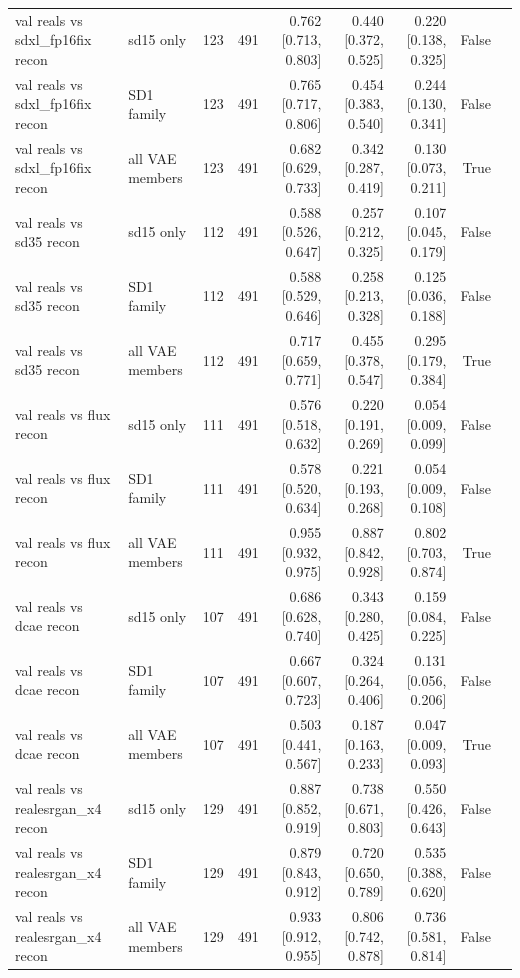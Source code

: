 \begin{table}[htbp]
\begin{tabular}{llrrrrrrr}
val reals vs sdxl\_fp16fix recon & sd15 only & 123 & 491 & 0.762 [0.713, 0.803] & 0.440 [0.372, 0.525] & 0.220 [0.138, 0.325] & False &  \\
val reals vs sdxl\_fp16fix recon & SD1 family & 123 & 491 & 0.765 [0.717, 0.806] & 0.454 [0.383, 0.540] & 0.244 [0.130, 0.341] & False &  \\
val reals vs sdxl\_fp16fix recon & all VAE members & 123 & 491 & 0.682 [0.629, 0.733] & 0.342 [0.287, 0.419] & 0.130 [0.073, 0.211] & True &  \\
val reals vs sd35 recon & sd15 only & 112 & 491 & 0.588 [0.526, 0.647] & 0.257 [0.212, 0.325] & 0.107 [0.045, 0.179] & False &  \\
val reals vs sd35 recon & SD1 family & 112 & 491 & 0.588 [0.529, 0.646] & 0.258 [0.213, 0.328] & 0.125 [0.036, 0.188] & False &  \\
val reals vs sd35 recon & all VAE members & 112 & 491 & 0.717 [0.659, 0.771] & 0.455 [0.378, 0.547] & 0.295 [0.179, 0.384] & True &  \\
val reals vs flux recon & sd15 only & 111 & 491 & 0.576 [0.518, 0.632] & 0.220 [0.191, 0.269] & 0.054 [0.009, 0.099] & False &  \\
val reals vs flux recon & SD1 family & 111 & 491 & 0.578 [0.520, 0.634] & 0.221 [0.193, 0.268] & 0.054 [0.009, 0.108] & False &  \\
val reals vs flux recon & all VAE members & 111 & 491 & 0.955 [0.932, 0.975] & 0.887 [0.842, 0.928] & 0.802 [0.703, 0.874] & True &  \\
val reals vs dcae recon & sd15 only & 107 & 491 & 0.686 [0.628, 0.740] & 0.343 [0.280, 0.425] & 0.159 [0.084, 0.225] & False &  \\
val reals vs dcae recon & SD1 family & 107 & 491 & 0.667 [0.607, 0.723] & 0.324 [0.264, 0.406] & 0.131 [0.056, 0.206] & False &  \\
val reals vs dcae recon & all VAE members & 107 & 491 & 0.503 [0.441, 0.567] & 0.187 [0.163, 0.233] & 0.047 [0.009, 0.093] & True &  \\
val reals vs realesrgan\_x4 recon & sd15 only & 129 & 491 & 0.887 [0.852, 0.919] & 0.738 [0.671, 0.803] & 0.550 [0.426, 0.643] & False &  \\
val reals vs realesrgan\_x4 recon & SD1 family & 129 & 491 & 0.879 [0.843, 0.912] & 0.720 [0.650, 0.789] & 0.535 [0.388, 0.620] & False &  \\
val reals vs realesrgan\_x4 recon & all VAE members & 129 & 491 & 0.933 [0.912, 0.955] & 0.806 [0.742, 0.878] & 0.736 [0.581, 0.814] & False &  \\

\end{tabular}
\end{table}
